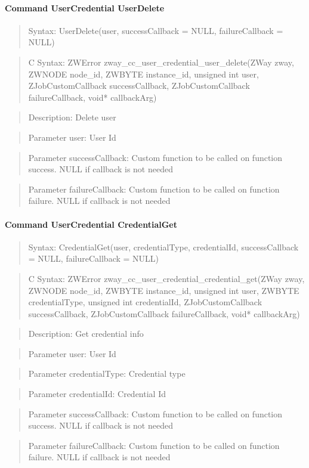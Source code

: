 \paragraph{Command UserCredential UserDelete}
\begin{quote}Syntax: UserDelete(user, successCallback = NULL, failureCallback = NULL)\end{quote}
\begin{quote}C Syntax: ZWError zway\_cc\_user\_credential\_user\_delete(ZWay zway, ZWNODE node\_id, ZWBYTE instance\_id, unsigned int user, ZJobCustomCallback successCallback, ZJobCustomCallback failureCallback, void* callbackArg)\end{quote}
\begin{quote}Description: Delete user\end{quote}
\begin{quote}Parameter user: User Id\end{quote}
\begin{quote}Parameter successCallback: Custom function to be called on function success. NULL if callback is not needed\end{quote}
\begin{quote}Parameter failureCallback: Custom function to be called on function failure. NULL if callback is not needed\end{quote}


\paragraph{Command UserCredential CredentialGet}
\begin{quote}Syntax: CredentialGet(user, credentialType, credentialId, successCallback = NULL, failureCallback = NULL)\end{quote}
\begin{quote}C Syntax: ZWError zway\_cc\_user\_credential\_credential\_get(ZWay zway, ZWNODE node\_id, ZWBYTE instance\_id, unsigned int user, ZWBYTE credentialType, unsigned int credentialId, ZJobCustomCallback successCallback, ZJobCustomCallback failureCallback, void* callbackArg)\end{quote}
\begin{quote}Description: Get credential info\end{quote}
\begin{quote}Parameter user: User Id\end{quote}
\begin{quote}Parameter credentialType: Credential type\end{quote}
\begin{quote}Parameter credentialId: Credential Id\end{quote}
\begin{quote}Parameter successCallback: Custom function to be called on function success. NULL if callback is not needed\end{quote}
\begin{quote}Parameter failureCallback: Custom function to be called on function failure. NULL if callback is not needed\end{quote}


